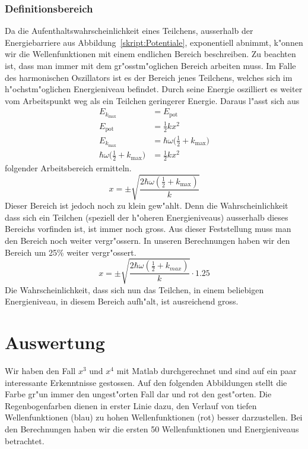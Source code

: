\begin{refsection}
\subsubsection{Definitionsbereich}
Da die  Aufenthaltswahrscheinlichkeit eines Teilchens,
ausserhalb der Energiebarriere aus Abbildung~\ref{skript:Potentiale},
exponentiell abnimmt,
k"onnen wir die Wellenfunktionen mit einem endlichen Bereich beschreiben.
Zu beachten ist,
dass man immer mit dem gr"osstm"oglichen Bereich arbeiten muss.
Im Falle des harmonischen Oszillators ist es der Bereich jenes Teilchens,
welches sich im h"ochstm"oglichen Energieniveau befindet.
Durch seine Energie oszilliert es weiter vom Arbeitspunkt weg
als ein Teilchen geringerer Energie.
Daraus l"asst sich aus
\begin{align*} 
E_{k_{\text{max}}}
&=
E_{\text{pot}}
\\
E_{\text{pot}}
&=
\frac12 kx^2
\\
E_{k_{\text{max}}}
&=
\hbar\omega\biggl(\frac12+k_{\text{max}}\biggr)
\\
\hbar\omega\biggl(\frac12+k_{\text{max}}\biggr)
&=
\frac12 kx^2
\end{align*}
folgender Arbeitsbereich ermitteln.
\[
x
=
\pm\sqrt{\frac{2\hbar\omega(\frac12+k_{\text{max}})}k}
\]
Dieser Bereich ist jedoch noch zu klein gew"ahlt.
Denn die Wahrscheinlichkeit dass sich ein Teilchen
(speziell der h"oheren Energieniveaus) ausserhalb dieses Bereichs vorfinden ist,
ist immer noch gross.
Aus dieser Feststellung muss man den Bereich noch weiter vergr"ossern.
In unseren Berechnungen haben wir den Bereich um 25\% weiter vergr"ossert.
\[
x
=
\pm\sqrt{\frac{2\hbar\omega(\frac12+k_{max})}k}\cdot 1.25
\]
Die Wahrscheinlichkeit,
dass sich nun das Teilchen, in einem beliebigen Energieniveau, in diesem Bereich aufh"alt,
ist ausreichend gross.


\section{Auswertung}

Wir haben den Fall $x^3$ und $x^4$ mit Matlab durchgerechnet und sind auf
ein paar interessante Erkenntnisse gestossen.
Auf den folgenden Abbildungen stellt die Farbe gr"un
immer den ungest"orten Fall dar und rot den gest"orten.
Die Regenbogenfarben dienen in erster Linie dazu, den Verlauf von
tiefen Wellenfunktionen (blau) zu hohen Wellenfunktionen (rot) besser darzustellen.
Bei den Berechnungen haben wir die ersten 50 Wellenfunktionen und Energieniveaus
betrachtet.


\end{refsection}
